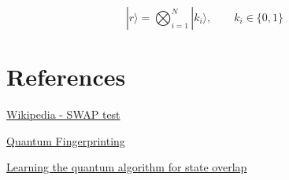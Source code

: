 \documentclass[11pt]{article}
\begin{document}
\begin{equation*}
  |r\rangle = \bigotimes_{i=1}^{N}|k_{i}\rangle, \qquad k_{i} \in \{0,1\}
\end{equation*}

\pagebreak

\section{References}
\label{sec:org73ac948}

\href{https://en.wikipedia.org/wiki/Swap\_test}{Wikipedia - SWAP test}

\href{https://arxiv.org/abs/quant-ph/0102001}{Quantum Fingerprinting}

\href{https://arxiv.org/abs/1803.04114}{Learning the quantum algorithm for state overlap}
\end{document}

